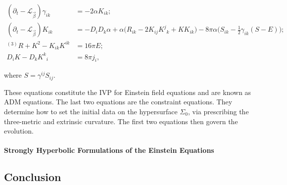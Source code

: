 {    \begin{align}
        (\partial_t - \mathcal{L}_{\vec{\beta}})\gamma_{ik} &= -2\alpha K_{ik}; \\
        (\partial_t - \mathcal{L}_{\vec{\beta}})K_{ik} &= -D_{i}D_{k}\alpha + \alpha\big(R_{ik} - 2K_{ij}{K^j}_k+KK_{ik}\big) - 8\pi\alpha\big(S_{ik} - \frac{1}{2}\gamma_{ik}(S-E)\big); \\
        {^{(3)}R} + K^2 - K_{ik}K^{ik} &= 16\pi E; \\
        D_{i}K-D_{k}{K^k}_i &= 8\pi j_i,
    \label{eq:theory:adm}
    \end{align}
    
    where $S = \gamma^{ij}S_{ij}$.
    
    These equations constitute the IVP for Einstein field equations and are known as ADM equations. 
    The last two equations are the constraint equations. They determine how to set the initial data on the hypersurface $\Sigma_0$, via prescribing the three-metric and extrinsic curvature. The first two equations then govern the evolution.
    
    
    
    \paragraph{Strongly Hyperbolic Formulations of the Einstein Equations}
    
    
    
    
    
    \subsection{Conclusion}
    
    
}
